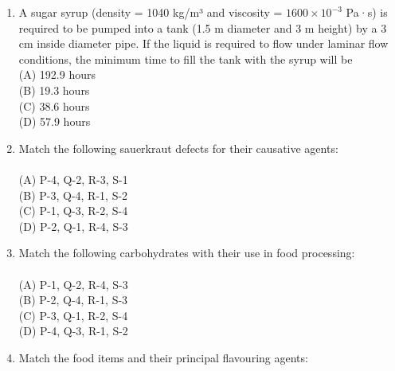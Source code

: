 \documentclass[journal,12pt,onecolumn]{IEEEtran}
\begin{document}
\begin{enumerate}
\item A sugar syrup (density = 1040 kg/m³ and viscosity = $1600 \times 10^{-3}$ Pa·s) is required to be pumped into a tank (1.5 m diameter and 3 m height) by a 3 cm inside diameter pipe. If the liquid is required to flow under laminar flow conditions, the minimum time to fill the tank with the syrup will be
\vspace{0.2cm}
\hfill{} \\
(A) 192.9 hours \\
(B) 19.3 hours \\
(C) 38.6 hours \\
(D) 57.9 hours
\vspace{0.5cm}

\newpage

\item Match the following sauerkraut defects for their causative agents:
\vspace{0.2cm} \\



\vspace{0.2cm}
\hfill{} \\
(A) P-4, Q-2, R-3, S-1 \\
(B) P-3, Q-4, R-1, S-2 \\
(C) P-1, Q-3, R-2, S-4 \\
(D) P-2, Q-1, R-4, S-3
\vspace{0.5cm}

\item Match the following carbohydrates with their use in food processing:
\vspace{0.2cm} \\



\vspace{0.2cm}
\hfill{} \\
(A) P-1, Q-2, R-4, S-3 \\
(B) P-2, Q-4, R-1, S-3 \\
(C) P-3, Q-1, R-2, S-4 \\
(D) P-4, Q-3, R-1, S-2
\vspace{0.5cm}

\item Match the food items and their principal flavouring agents:
\vspace{0.2cm} \\


\end{enumerate}
\end{document}
